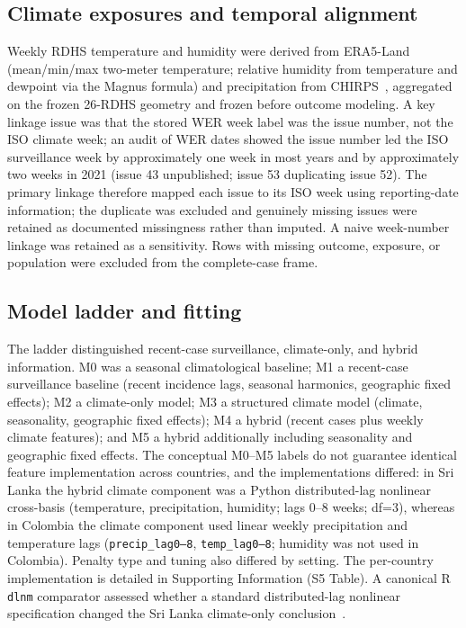 \documentclass[11pt,a4paper]{article}
\begin{document}
\subsection{Climate exposures and temporal alignment}
Weekly RDHS temperature and humidity were derived from ERA5-Land~\cite{MunozSabater2021,ERA5LandCDS} (mean/min/max two-meter temperature; relative humidity from temperature and dewpoint via the Magnus formula) and precipitation from CHIRPS~\cite{Funk2015,CHIRPS}, aggregated on the frozen 26-RDHS geometry and frozen before outcome modeling. A key linkage issue was that the stored WER week label was the issue number, not the ISO climate week; an audit of WER dates showed the issue number led the ISO surveillance week by approximately one week in most years and by approximately two weeks in 2021 (issue 43 unpublished; issue 53 duplicating issue 52). The primary linkage therefore mapped each issue to its ISO week using reporting-date information; the duplicate was excluded and genuinely missing issues were retained as documented missingness rather than imputed. A naive week-number linkage was retained as a sensitivity. Rows with missing outcome, exposure, or population were excluded from the complete-case frame.

\subsection{Model ladder and fitting}
The ladder distinguished recent-case surveillance, climate-only, and hybrid information. M0 was a seasonal climatological baseline; M1 a recent-case surveillance baseline (recent incidence lags, seasonal harmonics, geographic fixed effects); M2 a climate-only model; M3 a structured climate model (climate, seasonality, geographic fixed effects); M4 a hybrid (recent cases plus weekly climate features); and M5 a hybrid additionally including seasonality and geographic fixed effects. The conceptual M0--M5 labels do not guarantee identical feature implementation across countries, and the implementations differed: in Sri Lanka the hybrid climate component was a Python distributed-lag nonlinear cross-basis (temperature, precipitation, humidity; lags 0--8 weeks; df=3), whereas in Colombia the climate component used linear weekly precipitation and temperature lags (\texttt{precip\_lag0--8}, \texttt{temp\_lag0--8}; humidity was not used in Colombia). Penalty type and tuning also differed by setting. The per-country implementation is detailed in Supporting Information (S5 Table). A canonical R \texttt{dlnm} comparator assessed whether a standard distributed-lag nonlinear specification changed the Sri Lanka climate-only conclusion~\cite{Gasparrini2010,Gasparrini2011}.
\end{document}
